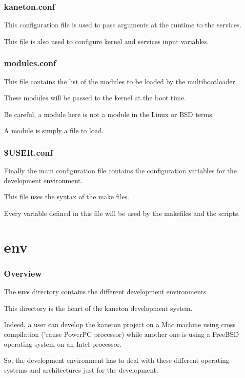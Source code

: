 \documentclass[8pt]{beamer}
\newcommand{\nl}[0]{\vspace{0.4cm}}
\begin{document}

\begin{frame}
  \frametitle{kaneton.conf}

  This configuration file is used to pass arguments at the runtime to the
  services.

  \nl

  This file is also used to configure kernel and services input variables.
\end{frame}


\begin{frame}
  \frametitle{modules.conf}

  This file contains the list of the modules to be loaded by the
  multibootloader.

  \nl

  These modules will be passed to the kernel at the boot time.

  \nl

  Be careful, a module here is not a module in the Linux or BSD terms.

  \nl

  A module is simply a file to load.
\end{frame}


\begin{frame}
  \frametitle{\$USER.conf}

  Finally the main configuration file contains the configuration
  variables for the development environment.

  \nl

  This file uses the syntax of the make files.

  \nl

  Every variable defined in this file will be used by the makefiles
  and the scripts.
\end{frame}

%
%

\section{env}


\begin{frame}
  \frametitle{Overview}

  The \textbf{env} directory contains the different development environments.

  \nl

  This directory is the heart of the kaneton development system.

  \nl

  Indeed, a user can develop the kaneton project on a Mac machine using
  cross compilation ('cause PowerPC processor) while another one is using
  a FreeBSD operating system on an Intel processor.

  \nl

  So, the development environment has to deal with these different operating
  systems and architectures just for the development.
\end{frame}
\end{document}

